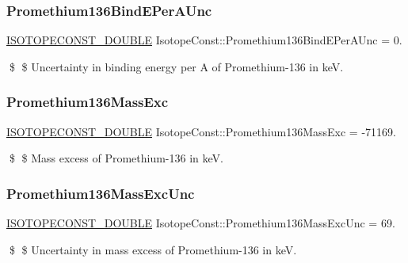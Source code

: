 \subsubsection{\texorpdfstring{Promethium136\+Bind\+E\+Per\+A\+Unc}{Promethium136BindEPerAUnc}}
{\footnotesize\ttfamily \mbox{\hyperlink{group___isotope_const-_macros_ga8f45a7272ce02c0b4c65c44636ed719a}{I\+S\+O\+T\+O\+P\+E\+C\+O\+N\+S\+T\+\_\+\+D\+O\+U\+B\+LE}} Isotope\+Const\+::\+Promethium136\+Bind\+E\+Per\+A\+Unc = 0.}

\$ \$ Uncertainty in binding energy per A of Promethium-\/136 in keV. \mbox{\label{group___isotope_const-_promethium-_pm136_gaeffda8e02d0417a9f1d66ec2598c80e7}} 
\subsubsection{\texorpdfstring{Promethium136\+Mass\+Exc}{Promethium136MassExc}}
{\footnotesize\ttfamily \mbox{\hyperlink{group___isotope_const-_macros_ga8f45a7272ce02c0b4c65c44636ed719a}{I\+S\+O\+T\+O\+P\+E\+C\+O\+N\+S\+T\+\_\+\+D\+O\+U\+B\+LE}} Isotope\+Const\+::\+Promethium136\+Mass\+Exc = -\/71169.}

\$ \$ Mass excess of Promethium-\/136 in keV. \mbox{\label{group___isotope_const-_promethium-_pm136_ga85e73a0f236df5a940bb2681c48d6959}} 
\subsubsection{\texorpdfstring{Promethium136\+Mass\+Exc\+Unc}{Promethium136MassExcUnc}}
{\footnotesize\ttfamily \mbox{\hyperlink{group___isotope_const-_macros_ga8f45a7272ce02c0b4c65c44636ed719a}{I\+S\+O\+T\+O\+P\+E\+C\+O\+N\+S\+T\+\_\+\+D\+O\+U\+B\+LE}} Isotope\+Const\+::\+Promethium136\+Mass\+Exc\+Unc = 69.}

\$ \$ Uncertainty in mass excess of Promethium-\/136 in keV. \mbox{\label{group___isotope_const-_promethium-_pm136_gac0460554a4764e47f7e2ebbe706a909c}} 
